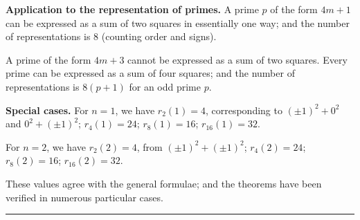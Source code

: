 \documentclass[12pt,a4paper]{article}
\begin{document}
\textbf{Application to the representation of primes.} A prime $p$ of the form
$4m+1$ can be expressed as a sum of two squares in essentially one way;
and the number of representations is $8$ (counting order and signs).

A prime of the form $4m+3$ cannot be expressed as a sum of two squares.
Every prime can be expressed as a sum of four squares; and the number
of representations is $8(p+1)$ for an odd prime $p$.

\textbf{Special cases.} For $n=1$, we have $r_2(1) = 4$, corresponding to
$(\pm 1)^2 + 0^2$ and $0^2 + (\pm 1)^2$; $r_4(1) = 24$; $r_8(1) = 16$; $r_{16}(1) = 32$.

For $n=2$, we have $r_2(2) = 4$, from $(\pm 1)^2 + (\pm 1)^2$;
$r_4(2) = 24$; $r_8(2) = 16$; $r_{16}(2) = 32$.

These values agree with the general formulae; and the theorems have
been verified in numerous particular cases.

\vspace{1cm}
\begin{center}
\rule{0.3\textwidth}{0.4pt}
\end{center}
\end{document}
